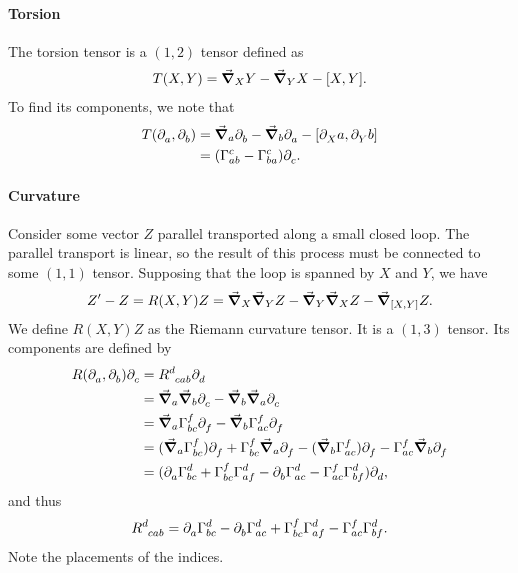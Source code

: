 \paragraph{Torsion}
The torsion tensor is a $(1, 2)$ tensor defined as
\begin{align*}
T(X, Y) = \dcov{X}{Y} - \dcov{Y}{X} - \comm{X}{Y}.
\end{align*}
To find its components, we note that
\begin{align*}
T(\del{a}{}, \del{b}{}) &= \dcov{a}{\del{b}{}} - \dcov{b}{\del{a}{}} - \comm{\del{X}{a}}{\del{Y}{b}} \\
&= (\chris{c}{a}{b} - \chris{c}{b}{a})\del{c}{}.
\end{align*}

\paragraph{Curvature}
Consider some vector $Z$ parallel transported along a small closed loop. The parallel transport is linear, so the result of this process must be connected to some $(1, 1)$ tensor. Supposing that the loop is spanned by $X$ and $Y$, we have
\begin{align*}
Z^{\prime} - Z = R(X, Y)Z = \dcov{X}{\dcov{Y}{Z}} - \dcov{Y}{\dcov{X}{Z}} - \dcov{\comm{X}{Y}}{Z}.
\end{align*}
We define $R(X, Y)Z$ as the Riemann curvature tensor. It is a $(1, 3)$ tensor. Its components are defined by
\begin{align*}
R(\del{a}{}, \del{b}{})\del{c}{} &= \tensor{R}{^{d}_{cab}}\del{d}{} \\
&= \dcov{a}{\dcov{b}{\del{c}{}}} - \dcov{b}{\dcov{a}{\del{c}{}}} \\
&= \dcov{a}{\chris{f}{b}{c}\del{f}{}} - \dcov{b}{\chris{f}{a}{c}\del{f}{}} \\
&= (\dcov{a}{\chris{f}{b}{c}})\del{f}{} + \chris{f}{b}{c}\dcov{a}{\del{f}{}} - (\dcov{b}{\chris{f}{a}{c}})\del{f}{} - \chris{f}{a}{c}\dcov{b}{\del{f}{}} \\
&= (\del{a}{\chris{d}{b}{c}} + \chris{f}{b}{c}\chris{d}{a}{f} - \del{b}{\chris{d}{a}{c}} - \chris{f}{a}{c}\chris{d}{b}{f})\del{d}{}, 
\end{align*}
and thus
\begin{align*}
\tensor{R}{^{d}_{cab}} = \del{a}{\chris{d}{b}{c}} - \del{b}{\chris{d}{a}{c}} + \chris{f}{b}{c}\chris{d}{a}{f} - \chris{f}{a}{c}\chris{d}{b}{f}.
\end{align*}
Note the placements of the indices.

